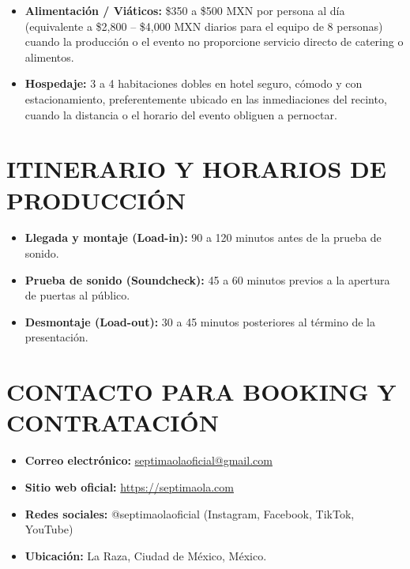\documentclass[a4paper,11pt]{article}
\newcommand{\sect}[1]{\vspace{0.4em}\section*{\normalfont\large\bfseries\MakeUppercase{#1}}\vspace{-0.2em}}
\begin{document}
\begin{itemize}[leftmargin=1.4em, itemsep=0.2em]
    \item \textbf{Alimentación / Viáticos:} \$350 a \$500 MXN por persona al día (equivalente a \$2,800 -- \$4,000 MXN diarios para el equipo de 8 personas) cuando la producción o el evento no proporcione servicio directo de catering o alimentos.
    \item \textbf{Hospedaje:} 3 a 4 habitaciones dobles en hotel seguro, cómodo y con estacionamiento, preferentemente ubicado en las inmediaciones del recinto, cuando la distancia o el horario del evento obliguen a pernoctar.
\end{itemize}

\sect{Itinerario y Horarios de Producción}

\begin{itemize}[leftmargin=1.4em, itemsep=0.2em]
    \item \textbf{Llegada y montaje (Load-in):} 90 a 120 minutos antes de la prueba de sonido.
    \item \textbf{Prueba de sonido (Soundcheck):} 45 a 60 minutos previos a la apertura de puertas al público.
    \item \textbf{Desmontaje (Load-out):} 30 a 45 minutos posteriores al término de la presentación.
\end{itemize}

\sect{Contacto para Booking y Contratación}

\begin{itemize}[leftmargin=1.4em, itemsep=0.2em]
    \item \textbf{Correo electrónico:} \href{mailto:septimaolaoficial@gmail.com}{septimaolaoficial@gmail.com}
    \item \textbf{Sitio web oficial:} \href{https://septimaola.com}{https://septimaola.com}
    \item \textbf{Redes sociales:} @septimaolaoficial (Instagram, Facebook, TikTok, YouTube)
    \item \textbf{Ubicación:} La Raza, Ciudad de México, México.
\end{itemize}
\end{document}
